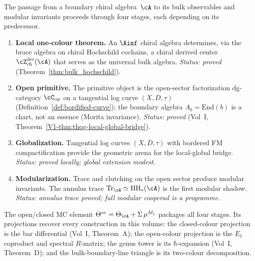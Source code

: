 The passage from a boundary chiral algebra~$\cA$ to its bulk
observables and modular invariants proceeds through four stages,
each depending on its predecessor.

\begin{enumerate}[label=\textup{Stage \arabic*.}, leftmargin=3em]
\item \textbf{Local one-colour theorem.}
 An $\Ainf$ chiral algebra determines, via the brace algebra on
 chiral Hochschild cochains, a chiral derived center
 $\cZ^{\mathrm{der}}_{\mathrm{ch}}(\cA)$ that serves as the
 universal bulk algebra. \emph{Status: proved}
 (Theorem~\ref{thm:bulk_hochschild}).

\item \textbf{Open primitive.}
 The primitive object is the open-sector factorization dg-category
 $\cC_{\mathrm{op}}$ on a tangential log curve $(X,D,\tau)$
 (Definition~\ref{def:bordified-curve}); the boundary algebra
 $A_b = \mathrm{End}(b)$ is a chart, not an essence (Morita
 invariance).
 \emph{Status: proved}
 (Vol~I, Theorem~\ref*{V1-thm:thqg-local-global-bridge}).

\item \textbf{Globalization.}
 Tangential log curves $(X,D,\tau)$ with bordered FM
 compactification provide the geometric arena for the local-global
 bridge.
 \emph{Status: proved locally; global extension modest.}

\item \textbf{Modularization.}
 Trace and clutching on the open sector produce modular invariants.
 The annulus trace
 $\mathrm{Tr}_\cA \simeq \mathrm{HH}_*(\cA)$ is the first modular
 shadow.
 \emph{Status: annulus trace proved; full modular cooperad is a
 programme.}
\end{enumerate}

\noindent
The open/closed MC element
$\Theta^{\mathrm{oc}} = \Theta_\cA + \Sigma\,\mu^{M_j}$
packages all four stages.
Its projections recover every construction in this volume:
the closed-colour projection is the bar differential
(Vol~I, Theorem~A);
the open-colour projection is the $E_1$ coproduct and spectral
$R$-matrix;
the genus tower is its $\hbar$-expansion
(Vol~I, Theorem~D);
and the bulk-boundary-line triangle is its two-colour decomposition.

